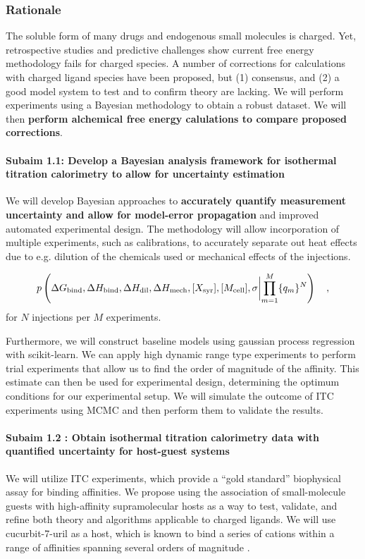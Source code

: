 \documentclass[10pt]{article}
\newcommand{\subsubsubsection}[1]{\paragraph*{#1}}
\begin{document}
\subsubsection*{Rationale}
The soluble form of many drugs and endogenous small molecules is charged. Yet, retrospective studies and predictive challenges show current free energy methodology fails for charged species\cite{Rocklin2013b,Muddana2014a}.
A number of corrections for calculations with charged ligand species have been proposed, but (1) consensus, and (2) a good model system to test and to confirm theory are lacking. We will perform experiments using a Bayesian methodology to obtain a robust dataset. We will then \textbf{ perform alchemical free energy calulations to compare proposed corrections}.
\subsubsubsection{Subaim 1.1: Develop a Bayesian analysis framework for isothermal titration calorimetry to allow for uncertainty estimation}
We will develop Bayesian approaches to \textbf{accurately quantify measurement uncertainty and allow for model-error propagation} and improved automated experimental design.
The methodology will allow incorporation of multiple experiments, such as calibrations, to accurately separate out heat effects due to e.g. dilution of the chemicals used or mechanical effects of the injections.

\begin{align}
	p\left(\Delta G_\mathrm{bind}, \Delta H_\mathrm{bind}, \Delta H_\mathrm{dil},\Delta H_\mathrm{mech}, [X_\mathrm{syr}], [M_\mathrm{cell}], \sigma \biggl{|} \prod\limits_{m=1}^{M}\{q_m\}^{N}\right) \quad,
\end{align}
for $N$ injections per $M$ experiments.

Furthermore, we will construct baseline models using gaussian process regression with scikit-learn\cite{Pedregosa2011a}.
We can apply high dynamic range type experiments to perform trial experiments that allow us to find the order of magnitude of the affinity.
This estimate can then be used for experimental design, determining the optimum conditions for our experimental setup.
We will simulate the outcome of ITC experiments using MCMC and then perform them to validate the results.

\subsubsubsection{Subaim 1.2 : Obtain isothermal titration calorimetry data with quantified uncertainty for host-guest systems}
We will utilize ITC experiments, which provide a “gold standard” biophysical assay for binding affinities.
We propose using the association of small-molecule guests with high-affinity supramolecular hosts as a way to test, validate, and refine both theory and algorithms applicable to charged ligands.
We will use cucurbit-7-uril \cite{Lagona2005a} as a host, which is known to bind a series of cations within a range of affinities spanning several orders of magnitude \cite{Cao2013a}.
\end{document}
